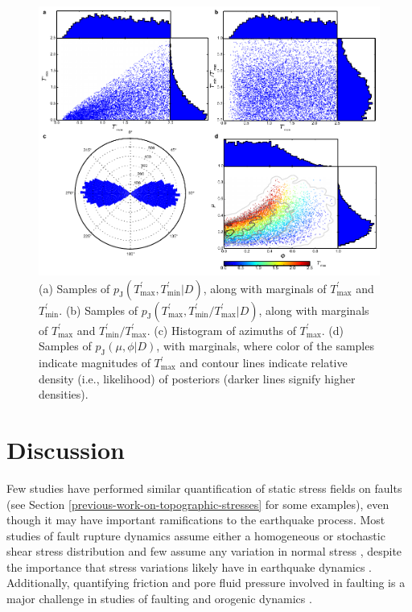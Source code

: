 \documentclass[twocolumn,jgrga]{AGUTeX}
\begin{document}
\begin{article}
{\begin{figure}[t]
\centering
\includegraphics[width=40pc]{../figures/joint_pdfs.pdf}
\caption{(a) Samples of
$p_{\mathrm{J}}(T^\prime_{\mathrm{max}},T^\prime_{\mathrm{min}} | D)$,
along with marginals of $T^\prime_{\mathrm{max}}$ and
$T^\prime_{\mathrm{min}}$. (b) Samples of
$p_{\mathrm{J}}(T^\prime_{\mathrm{\max}}, T^\prime_{\mathrm{\min}}/T^\prime_{\mathrm{max}} | D)$,
along with marginals of $T^\prime_{\mathrm{max}}$ and
$T^\prime_{\mathrm{min}} / T^\prime_{\mathrm{max}}$. (c) Histogram of
azimuths of $T^\prime_{\mathrm{\max}}$. (d) Samples of
$p_{\mathrm{J}}(\mu, \phi | D)$, with marginals, where color of the samples
indicate magnitudes of $T^\prime_{\mathrm{\max}}$ and contour
lines indicate relative density (i.e., likelihood) of posteriors (darker
lines signify higher densities).}
\label{fig:joint_posteriors}
\end{figure}

\section{Discussion}\label{discussion}

Few studies have performed similar quantification of static stress
fields on faults (see Section
\ref{previous-work-on-topographic-stresses} for some examples), even
though it may have important ramifications to the earthquake process.
Most studies of fault rupture dynamics
assume either a homogeneous or stochastic shear stress distribution
\citep[e.g.,][]{oglesbyday2002} and few assume any variation in normal
stress \citep[e.g.,][]{aagaard2001}, despite the importance that stress
variations likely have in earthquake dynamics \citep[e.g.,][]{day1982,
olsen1997}. Additionally, quantifying friction and pore fluid
pressure involved in faulting is a major challenge in studies of
faulting and orogenic dynamics \citep[e.g.,][]{meissner1982,
oglesbyday2002}.

}
\end{article}
\end{document}
